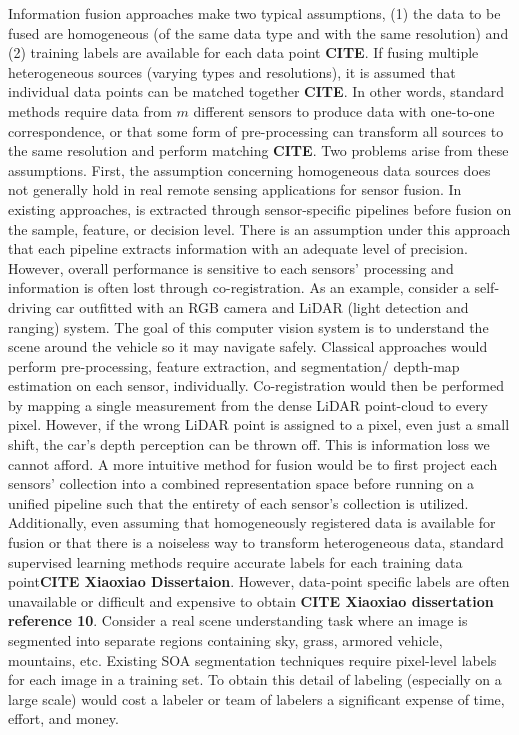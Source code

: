 Information fusion approaches make two typical assumptions, (1) the data to be fused are homogeneous (of the same data type and with the same resolution) and (2) training labels are available for each data point \textbf{CITE}.  If fusing multiple heterogeneous sources (varying types and resolutions), it is assumed that individual data points can be matched together \textbf{CITE}.  In other words, standard methods require data from $m$ different sensors to produce data with one-to-one correspondence, or that some form of pre-processing can transform all sources to the same resolution and perform matching \textbf{CITE}. 
\newline
Two problems arise from these assumptions.  First, the assumption concerning homogeneous data sources does not generally hold in real remote sensing applications for sensor fusion.  In existing approaches, is extracted through sensor-specific pipelines before fusion on the sample, feature, or decision level.  There is an assumption under this approach that each pipeline extracts information with an adequate level of precision.  However, overall performance is sensitive to each sensors' processing and information is often lost through co-registration.  As an example, consider a self-driving car outfitted with an RGB camera and LiDAR (light detection and ranging) system. The goal of this computer vision system is to understand the scene around the vehicle so it may navigate safely.  Classical approaches would perform pre-processing, feature extraction, and segmentation/ depth-map estimation on each sensor, individually.  Co-registration would then be performed by mapping a single measurement from the dense LiDAR point-cloud to every pixel.  However, if the wrong LiDAR point is assigned to a pixel, even just a small shift, the car's depth perception can be thrown off.  This is information loss we cannot afford.  A more intuitive method for fusion would be to first project each sensors' collection into a combined representation space before running on a unified pipeline such that the entirety of each sensor's collection is utilized. 
\newline
Additionally, even assuming that homogeneously registered data is available for fusion or that there is a noiseless way to transform heterogeneous  data, standard supervised learning methods require accurate labels for each training data point\textbf{CITE Xiaoxiao Dissertaion}.  However, data-point specific labels are often unavailable or difficult and expensive to obtain \textbf{CITE Xiaoxiao dissertation reference 10}. Consider a real scene understanding task where an image is segmented into separate regions containing sky, grass, armored vehicle, mountains, etc.  Existing SOA segmentation techniques require pixel-level labels for each image in a training set.  To obtain this detail of labeling (especially on a large scale) would cost a labeler or team of labelers a significant expense of time, effort, and money.

